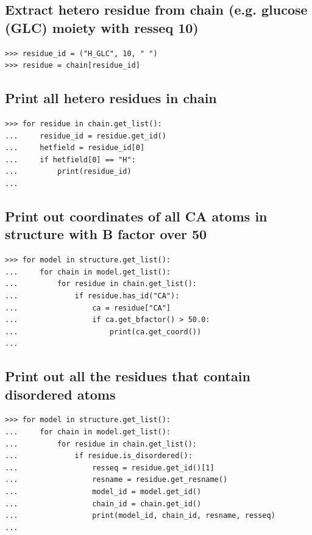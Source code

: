 \subsection*{Extract hetero residue from chain (e.g. glucose (GLC) moiety with resseq 10)}

\begin{verbatim}
>>> residue_id = ("H_GLC", 10, " ")
>>> residue = chain[residue_id]
\end{verbatim}

\subsection*{Print all hetero residues in chain}

\begin{verbatim}
>>> for residue in chain.get_list():
...     residue_id = residue.get_id()
...     hetfield = residue_id[0]
...     if hetfield[0] == "H":
...         print(residue_id)
...
\end{verbatim}

\subsection*{Print out coordinates of all CA atoms in structure with B factor over 50}

\begin{verbatim}
>>> for model in structure.get_list():
...     for chain in model.get_list():
...         for residue in chain.get_list():
...             if residue.has_id("CA"):
...                 ca = residue["CA"]
...                 if ca.get_bfactor() > 50.0:
...                     print(ca.get_coord())
...
\end{verbatim}

\subsection*{Print out all the residues that contain disordered atoms}

\begin{verbatim}
>>> for model in structure.get_list():
...     for chain in model.get_list():
...         for residue in chain.get_list():
...             if residue.is_disordered():
...                 resseq = residue.get_id()[1]
...                 resname = residue.get_resname()
...                 model_id = model.get_id()
...                 chain_id = chain.get_id()
...                 print(model_id, chain_id, resname, resseq)
...
\end{verbatim}

